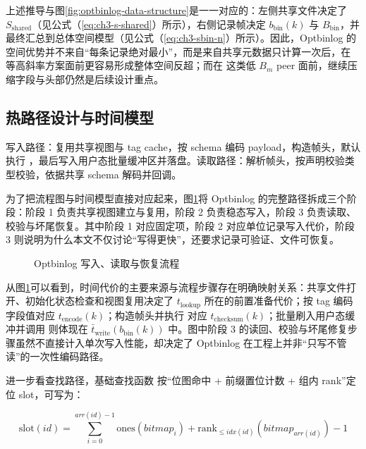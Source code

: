 上述推导与图\ref{fig:optbinlog-data-structure}是一一对应的：左侧共享文件决定了 \(S_{\text{shared}}\)（见公式（\ref{eq:ch3-s-shared}）所示），右侧记录帧决定 \(b_{\text{bin}}(k)\) 与 \(B_{\text{bin}}\)，并最终汇总到总体空间模型（见公式（\ref{eq:ch3-sbin-n}）所示）。因此，Optbinlog 的空间优势并不来自``每条记录绝对最小''，而是来自共享元数据只计算一次后，在  等高斜率方案面前更容易形成整体空间反超；而在  这类低 \(B_m\) peer 面前，继续压缩字段与头部仍然是后续设计重点。

\subsection{热路径设计与时间模型}\label{ux70edux8defux5f84ux8bbeux8ba1ux4e0eux65f6ux95f4ux6a21ux578b}

写入路径：复用共享视图与 tag cache，按 schema 编码 payload，构造帧头，默认执行 ，最后写入用户态批量缓冲区并落盘。读取路径：解析帧头，按声明校验类型校验，依据共享 schema 解码并回调。

为了把流程图与时间模型直接对应起来，图\ref{fig:optbinlog-rw-flow}将 Optbinlog 的完整路径拆成三个阶段：阶段 1 负责共享视图建立与复用，阶段 2 负责稳态写入，阶段 3 负责读取、校验与坏尾恢复。其中阶段 1 对应固定项，阶段 2 对应单位记录写入代价，阶段 3 则说明为什么本文不仅讨论``写得更快''，还要求记录可验证、文件可恢复。

\begin{figure}[H]
\centering

\caption{Optbinlog 写入、读取与恢复流程}
\label{fig:optbinlog-rw-flow}
\end{figure}

从图\ref{fig:optbinlog-rw-flow}可以看到，时间代价的主要来源与流程步骤存在明确映射关系：共享文件打开、初始化状态检查和视图复用决定了 \(t_{\text{lookup}}\) 所在的前置准备代价；按 tag 编码字段值对应 \(t_{\text{encode}}(k)\)；构造帧头并执行  对应 \(t_{\text{checksum}}(k)\)；批量刷入用户态缓冲并调用  则体现在 \(\bar t_{\text{write}}(b_{\text{bin}}(k))\) 中。图中阶段 3 的读回、校验与坏尾修复步骤虽然不直接计入单次写入性能，却决定了 Optbinlog 在工程上并非``只写不管读''的一次性编码路径。

进一步看查找路径，基础查找函数  按``位图命中 + 前缀置位计数 + 组内 rank''定位 slot，可写为：

\[
\text{slot}(id)=\sum_{i=0}^{arr(id)-1}\mathrm{ones}(bitmap_i)+\mathrm{rank}_{\le idx(id)}(bitmap_{arr(id)})-1
\]

